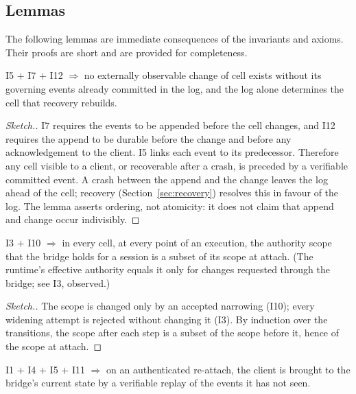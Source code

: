 \subsection{Lemmas}\label{sec:lemmas}

The following lemmas are immediate consequences of the invariants and
axioms. Their proofs are short and are provided for completeness.

\begin{lemma}\label{lem:atomicity}
I5 $+$ I7 $+$ I12 $\Rightarrow$ no externally observable change of cell
exists without its governing events already committed in the log, and
the log alone determines the cell that recovery rebuilds.
\end{lemma}

\begin{proof}[Sketch.]
I7 requires the events to be appended before the cell changes, and I12
requires the append to be durable before the change and before any
acknowledgement to the client. I5 links each event to its predecessor.
Therefore any cell visible to a client, or recoverable after a crash,
is preceded by a verifiable committed event. A crash between the append
and the change leaves the log ahead of the cell; recovery
(Section~\ref{sec:recovery}) resolves this in favour of the log. The
lemma asserts ordering, not atomicity: it does not claim that append and
change occur indivisibly. \qedhere
\end{proof}

\begin{lemma}\label{lem:no-drift}
I3 $+$ I10 $\Rightarrow$ in every cell, at every point of an execution,
the authority scope that the bridge holds for a session is a subset of
its scope at attach. (The runtime's effective authority equals it only
for changes requested through the bridge; see I3, observed.)
\end{lemma}

\begin{proof}[Sketch.]
The scope is changed only by an accepted narrowing (I10); every
widening attempt is rejected without changing it (I3). By induction
over the transitions, the scope after each step is a subset of the scope
before it, hence of the scope at attach. \qedhere
\end{proof}

\begin{lemma}\label{lem:recover}
I1 $+$ I4 $+$ I5 $+$ I11 $\Rightarrow$ on an authenticated re-attach,
the client is brought to the bridge's current state by a verifiable
replay of the events it has not seen.
\end{lemma}

